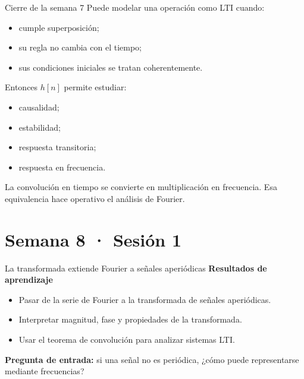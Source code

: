 \documentclass[
  ignorenonframetext,
  aspectratio=169,
  spanish,
  professionalfonts]{beamer}
\providecommand{\tightlist}{%
  \setlength{\itemsep}{0pt}\setlength{\parskip}{0pt}}
\begin{document}
\begin{frame}[shrink]{Cierre de la semana 7}
\protect{}\label{cierre-de-la-semana-7}
Puede modelar una operación como LTI cuando:

\begin{itemize}
\tightlist
\item
  cumple superposición;
\item
  su regla no cambia con el tiempo;
\item
  sus condiciones iniciales se tratan coherentemente.
\end{itemize}

Entonces \(h[n]\) permite estudiar:

\begin{itemize}
\tightlist
\item
  causalidad;
\item
  estabilidad;
\item
  respuesta transitoria;
\item
  respuesta en frecuencia.
\end{itemize}

\begin{tcolorbox}[enhanced jigsaw, arc=.35mm, bottomrule=.15mm, bottomtitle=1mm, breakable, colback=white, colbacktitle=quarto-callout-important-color!10!white, colframe=quarto-callout-important-color-frame, coltitle=black, left=2mm, leftrule=.75mm, opacityback=0, opacitybacktitle=0.6, rightrule=.15mm, title={Puente a la semana 8}, titlerule=0mm, toprule=.15mm, toptitle=1mm]

La convolución en tiempo se convierte en multiplicación en frecuencia.
Esa equivalencia hace operativo el análisis de Fourier.

\end{tcolorbox}
\end{frame}

\section{Semana 8 · Sesión 1}\label{semana-8-sesiuxf3n-1}

\begin{frame}{La transformada extiende Fourier a señales aperiódicas}
\protect{}\label{la-transformada-extiende-fourier-a-seuxf1ales-aperiuxf3dicas}
\textbf{Resultados de aprendizaje}

\begin{itemize}
\tightlist
\item
  Pasar de la serie de Fourier a la transformada de señales aperiódicas.
\item
  Interpretar magnitud, fase y propiedades de la transformada.
\item
  Usar el teorema de convolución para analizar sistemas LTI.
\end{itemize}

\textbf{Pregunta de entrada:} si una señal no es periódica, ¿cómo puede
representarse mediante frecuencias?
\end{frame}
\end{document}
